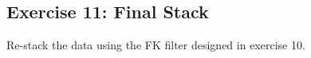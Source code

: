 \subsection*{Exercise 11: Final Stack}
Re-stack the data using the FK filter designed in exercise 10.

%
%
%
%
%
%
%
%
%


